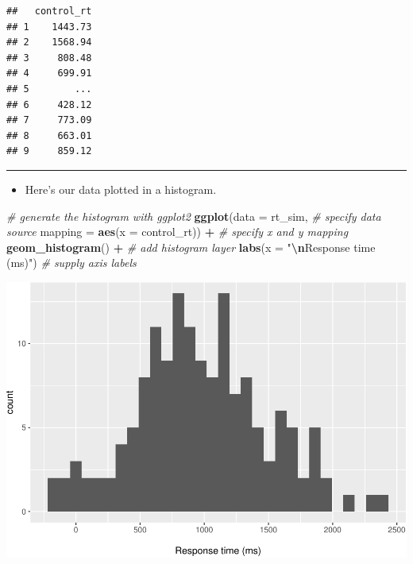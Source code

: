 \documentclass[
]{article}
\newenvironment{Shaded}{\begin{snugshade}}{\end{snugshade}}
\newcommand{\AttributeTok}[1]{\textcolor[rgb]{0.13,0.29,0.53}{#1}}
\newcommand{\CommentTok}[1]{\textcolor[rgb]{0.56,0.35,0.01}{\textit{#1}}}
\newcommand{\FunctionTok}[1]{\textcolor[rgb]{0.13,0.29,0.53}{\textbf{#1}}}
\newcommand{\NormalTok}[1]{#1}
\newcommand{\SpecialCharTok}[1]{\textcolor[rgb]{0.81,0.36,0.00}{\textbf{#1}}}
\newcommand{\StringTok}[1]{\textcolor[rgb]{0.31,0.60,0.02}{#1}}
\providecommand{\tightlist}{%
  \setlength{\itemsep}{0pt}\setlength{\parskip}{0pt}}
\begin{document}
\begin{verbatim}
##   control_rt
## 1    1443.73
## 2    1568.94
## 3     808.48
## 4     699.91
## 5        ...
## 6     428.12
## 7     773.09
## 8     663.01
## 9     859.12
\end{verbatim}

\begin{center}\rule{0.5\linewidth}{0.5pt}\end{center}

\begin{itemize}
\tightlist
\item
  Here's our data plotted in a histogram.
\end{itemize}

\begin{Shaded}
\begin{Highlighting}[]
\CommentTok{\# generate the histogram with ggplot2}
\FunctionTok{ggplot}\NormalTok{(}\AttributeTok{data =}\NormalTok{ rt\_sim,                   }\CommentTok{\# specify data source}
       \AttributeTok{mapping =} \FunctionTok{aes}\NormalTok{(}\AttributeTok{x =}\NormalTok{ control\_rt)) }\SpecialCharTok{+} \CommentTok{\# specify x and y mapping}
  \FunctionTok{geom\_histogram}\NormalTok{() }\SpecialCharTok{+}                    \CommentTok{\# add histogram layer}
  \FunctionTok{labs}\NormalTok{(}\AttributeTok{x =} \StringTok{"}\SpecialCharTok{\textbackslash{}n}\StringTok{Response time (ms)"}\NormalTok{)      }\CommentTok{\# supply axis labels}
\end{Highlighting}
\end{Shaded}

\includegraphics{L6_Correlation_and_regresion_simulation_pdf_files/figure-latex/rnorm plot-1.pdf}
\end{document}
